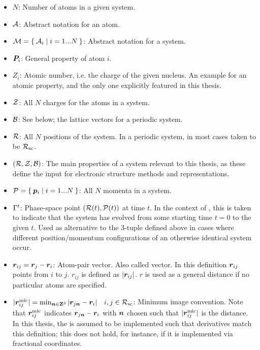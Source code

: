 \begin{itemize}
	\item $N$: Number of atoms in a given system.
	\item $\mathcal{A}$: Abstract notation for an atom.
	\item $\mathcal{M} = \Set{\mathcal{A}_i | i=1...N}$: Abstract notation for a system.
	\item $\boldsymbol{P}_i$: General property of atom $i$.
	\item $Z_i$: Atomic number, i.e. the charge of the given nucleus. An example for an atomic property, and the only one explicitly featured in this thesis.
	\item $\mathcal{Z}$: All $N$ charges for the atoms in a system.
	\item $\mathcal{B}$: See below; the lattice vectors for a periodic system.
	\item $\mathcal{R}$: All $N$ positions of the system. In a periodic system, in most cases taken to be $\mathcal{R_{\text{sc}}}$.
	\item $(\mathcal{R}, \mathcal{Z}, \mathcal{B})$: The main properties of a system relevant to this thesis, as these define the input for electronic structure methods and representations.
	\item $\mathcal{P}=\Set{\boldsymbol{p}_i | i=1...N}$: All $N$ momenta in a system.
	\item $\Gamma_{}^{t}$: Phase-space point $(\mathcal{R}(t), \mathcal{P}(t))$ at time $t$. In the context of \md, this is taken to indicate that the system has evolved from some starting time $t=0$ to the given $t$. Used as alternative to the 3-tuple defined above in cases where different position/momentum configurations of an otherwise identical system occur.
	\item $\boldsymbol{r}_{ij} = \boldsymbol{r}_j - \boldsymbol{r}_i$: Atom-pair vector. Also called  vector. In this definition $\boldsymbol{r}_{ij}$ points from $i$ to $j$. $r_{ij}$ is defined as $|\boldsymbol{r}_{ij}|$. $r$ is used as a general distance if no particular atoms are specified.
	\item $|\boldsymbol{r}^{\text{mic}}_{ij}| = \min_{\boldsymbol{n} \in {\bf Z}^3} |\boldsymbol{r}_{j\boldsymbol{n}} - \boldsymbol{r}_i| \quad i,j \in \mathcal{R_{\text{sc}}}$: Minimum image convention. Note that $\boldsymbol{r}^{\text{mic}}_{ij}$ indicates $\boldsymbol{r}_{j\boldsymbol{n}} - \boldsymbol{r}_i$ with $\boldsymbol{n}$ chosen such that $|\boldsymbol{r}^{\text{mic}}_{ij}|$ is the \mic distance. In this thesis, the \mic is assumed to be implemented such that derivatives match this definition; this does not hold, for instance, if it is implemented via fractional coordinates.
\end{itemize}

